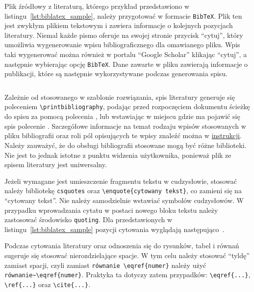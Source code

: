 Plik źródłowy z literaturą, którego przykład przedstawiono w listingu~\ref{lst:biblatex_sample}, należy przygotować w formacie \texttt{BibTeX}. Plik ten jest zwykłym plikiem tekstowym i zawiera informacje o kolejnych pozycjach literatury. Niemal każde pismo oferuje na swojej stronie przycisk \enquote{cytuj}, który umożliwia wygenerowanie wpisu bibliograficznego dla omawianego pliku. Wpis taki wygenerować można również w portalu \enquote{Google Scholar} klikając \enquote{cytuj}, a następnie wybierając opcję \texttt{BibTeX}. Dane zawarte w pliku zawierają informacje o publikacji, które są następnie wykorzystywane podczas generowania spisu.

\begin{listing}[htb]
\inputminted{bibtex}{skrypty/biblatex_sample.bib}
\end{listing}

Zależnie od stosowanego w szablonie rozwiązania, spis literatury generuje się poleceniem \verb|\printbibliography|, podając przed rozpoczęciem dokumentu ścieżkę do spisu za pomocą polecenia \verb||, lub wstawiając w miejscu gdzie ma pojawić się spis polecenie \verb||. Szczegółowe informacje na temat rodzaju wpisów stosowanych w pliku bibliografii oraz roli pól opisujących te wpisy znaleźć można w \href{https://www.overleaf.com/learn/latex/Bibliography_management_in_LaTeX}{instrukcji}. Należy zauważyć, że do obsługi bibliografii stosowane mogą być różne biblioteki. Nie jest to jednak istotne z punktu widzenia użytkownika, ponieważ plik ze spisem literatury jest uniwersalny.

Jeżeli wymagane jest umieszczenie fragmentu tekstu w cudzysłowie, stosować należy bibliotekę \texttt{csquotes} oraz \verb|\enquote{cytowany tekst}|, co zamieni się na \enquote{cytowany tekst}. Nie należy samodzielnie wstawiać symbolów cudzysłowów. W przypadku wprowadzania cytatu w postaci nowego bloku tekstu należy zastosować środowisko \texttt{quoting}. Dla przedstawionych w listingu~\ref{lst:biblatex_sample} pozycji cytowania wyglądają następująco~\cite{ldrjro_dwtownerr, mallat_wavelet}.

Podczas cytowania literatury oraz odnoszenia się do rysunków, tabel i równań sugeruje się stosować nierozdzielające spacje. W tym celu należy stosować \enquote{tyldę} zamiast spacji, czyli zamiast \verb|równanie \eqref{numer}| należy użyć \verb|równanie~\eqref{numer}|. Praktyka ta dotyczy zatem przypadków: \verb|\eqref{...}|, \verb|\ref{...}| oraz \verb|\cite{...}|.

